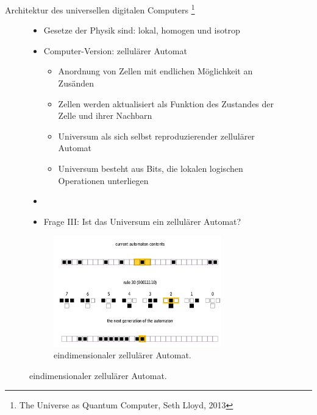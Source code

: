 \documentclass[aspectratio=1610, 9pt]{beamer}
\begin{document}
\begin{frame}{Architektur des universellen digitalen Computers \footnote[8]{The Universe as Quantum Computer, Seth Lloyd, 2013}}
  \begin{figure}
    \begin{minipage}{0.49\textwidth}
      \begin{itemize}
        \item Gesetze der Physik sind: lokal, homogen und isotrop
        \item[\rightarrow] Computer-Version: zellulärer Automat
        \begin{itemize}
          \item Anordnung von Zellen mit endlichen Möglichkeit an Zusänden
          \item Zellen werden aktualisiert als Funktion des Zustandes der Zelle und ihrer Nachbarn
          \item Universum als sich selbst reproduzierender zellulärer Automat
          \item Universum besteht aus Bits, die lokalen logischen Operationen unterliegen
        \end{itemize}
        \item[]
        \item[\rightarrow] Frage III: Ist das Universum ein zellulärer Automat?
      \end{itemize}
    \end{minipage}
    \hfill
    \begin{minipage}{0.49\textwidth}
      \begin{figure}
        \includegraphics[width=0.8\textwidth]{images/zelle.png}
        \caption{eindimensionaler zellulärer Automat. \footnotemark[11]}
      \end{figure}
    \end{minipage}
  \end{figure}


\end{frame}
\end{document}
